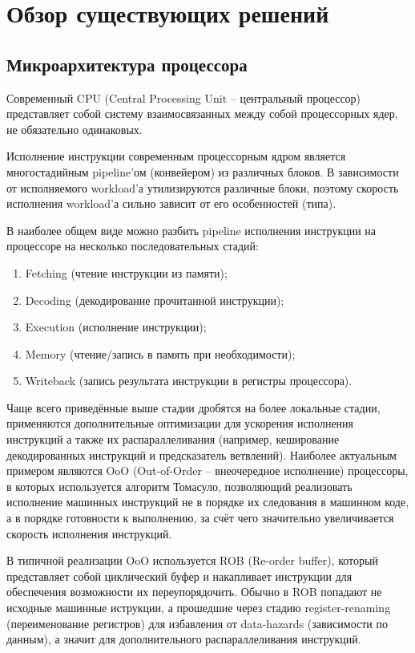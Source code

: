 \section{Обзор существующих решений}
\label{sec:Section2} 

\subsection{Микроархитектура процессора}

    Современный CPU (Central Processing Unit -- центральный процессор) представляет собой
    систему взаимосвязанных между собой процессорных ядер, не обязательно одинаковых.

    Исполнение инструкции современным процессорным ядром является многостадийным pipeline'ом
    (конвейером) из различных блоков. В зависимости от исполняемого workload'а утилизируются
    различные блоки, поэтому скорость исполнения workload'а сильно зависит от его особенностей
    (типа).

    В наиболее общем виде можно разбить pipeline исполнения инструкции на процессоре на несколько
    последовательных стадий:
    \begin{enumerate}
        \item Fetching (чтение инструкции из памяти);
        \item Decoding (декодирование прочитанной инструкции);
        \item Execution (исполнение инструкции);
        \item Memory (чтение/запись в память при необходимости);
        \item Writeback (запись результата инструкции в регистры процессора).
    \end{enumerate}

    Чаще всего приведённые выше стадии дробятся на более локальные стадии, применяются
    дополнительные оптимизации для ускорения исполнения инструкций а также их распараллеливания
    (например, кеширование декодированных инструкций и предсказатель ветвлений). Наиболее
    актуальным примером являются OoO (Out-of-Order -- внеочередное исполнение) процессоры,
    в которых используется алгоритм Томасуло, позволяющий реализовать
    исполнение машинных инструкций не в порядке их следования в машинном коде, а в порядке
    готовности к выполнению, за счёт чего значительно увеличивается скорость исполнения инструкций.

    В типичной реализации OoO используется ROB (Re-order buffer), который представляет собой
    циклический буфер и накапливает инструкции для обеспечения возможности их переупорядочить.
    Обычно в ROB попадают не исходные машинные иструкции, а прошедшие через стадию register-renaming
    (переименование регистров) для избавления от data-hazards (зависимости по данным), а значит для
    дополнительного распараллеливания инструкций.

